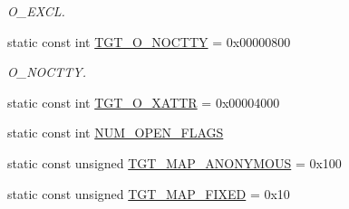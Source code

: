 \begin{DoxyCompactItemize}
\begin{DoxyCompactList}\small\item\em O\_\-EXCL. \item\end{DoxyCompactList}\item 
static const int \hyperlink{classSparcSolaris_adfd4240281579e5f60c5e22c601225d8}{TGT\_\-O\_\-NOCTTY} = 0x00000800
\begin{DoxyCompactList}\small\item\em O\_\-NOCTTY. \item\end{DoxyCompactList}\item 
static const int \hyperlink{classSparcSolaris_a1f98faca34578b4879065b3d10902e40}{TGT\_\-O\_\-XATTR} = 0x00004000
\item 
static const int \hyperlink{classSparcSolaris_ad85b9918c8f2c8739537a002dc1dc526}{NUM\_\-OPEN\_\-FLAGS}
\item 
static const unsigned \hyperlink{classSparcSolaris_a0bbc267200567dd98250b99b6085a499}{TGT\_\-MAP\_\-ANONYMOUS} = 0x100
\item 
static const unsigned \hyperlink{classSparcSolaris_a0124e421d7846143bca15728b7a53e14}{TGT\_\-MAP\_\-FIXED} = 0x10
\end{DoxyCompactItemize}


